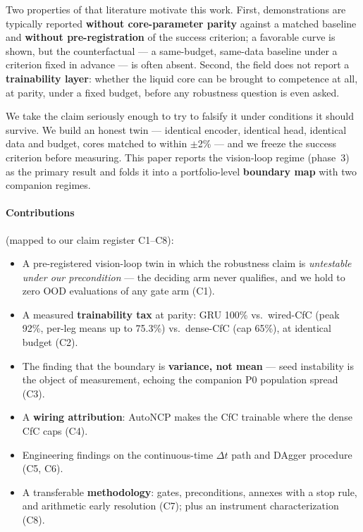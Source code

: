 \documentclass[11pt]{article}
\begin{document}
Two properties of that literature motivate this work. First, demonstrations are typically reported \textbf{without core-parameter parity} against a matched baseline and \textbf{without pre-registration} of the success criterion; a favorable curve is shown, but the counterfactual --- a same-budget, same-data baseline under a criterion fixed in advance --- is often absent. Second, the field does not report a \textbf{trainability layer}: whether the liquid core can be brought to competence at all, at parity, under a fixed budget, before any robustness question is even asked.

We take the claim seriously enough to try to falsify it under conditions it should survive. We build an honest twin --- identical encoder, identical head, identical data and budget, cores matched to within $\pm$2\% --- and we freeze the success criterion before measuring. This paper reports the vision-loop regime (phase~3) as the primary result and folds it into a portfolio-level \textbf{boundary map} with two companion regimes.

\paragraph{Contributions} (mapped to our claim register C1--C8):
\begin{itemize}
  \item A pre-registered vision-loop twin in which the robustness claim is \emph{untestable under our precondition} --- the deciding arm never qualifies, and we hold to zero OOD evaluations of any gate arm (C1).
  \item A measured \textbf{trainability tax} at parity: GRU 100\% vs.\ wired-CfC (peak 92\%, per-leg means up to 75.3\%) vs.\ dense-CfC (cap 65\%), at identical budget (C2).
  \item The finding that the boundary is \textbf{variance, not mean} --- seed instability is the object of measurement, echoing the companion P0 population spread (C3).
  \item A \textbf{wiring attribution}: AutoNCP makes the CfC trainable where the dense CfC caps (C4).
  \item Engineering findings on the continuous-time $\Delta t$ path and DAgger procedure (C5, C6).
  \item A transferable \textbf{methodology}: gates, preconditions, annexes with a stop rule, and arithmetic early resolution (C7); plus an instrument characterization (C8).
\end{itemize}
\end{document}
